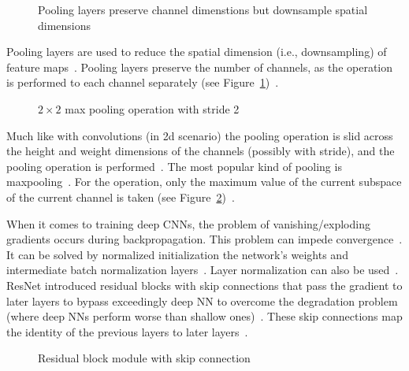 \begin{figure}[h]
    \centering
    \caption[Channel dimension preserving of pooling layers]{%
        Pooling layers preserve channel dimenstions but downsample spatial
        dimensions\label{fig:pool-layer}
    }
\end{figure}
Pooling layers are used to reduce the spatial dimension (i.e., downsampling) of feature
maps~\citep{ponti_everything_2017}.
Pooling layers preserve the number of channels, as the operation is performed to each channel
separately (see Figure~\ref{fig:pool-layer})~\citep{chauhan_review_2018}.
\begin{figure}[ht]
    \centering
    \caption[Visualization of a max pooling operation]{%
        $2\times 2$ max pooling operation with stride
        2~\citep{chauhan_review_2018}\label{fig:maxpool}
    }
\end{figure}
Much like with convolutions (in 2d scenario) the pooling operation is slid across the height and
weight dimensions of the channels (possibly with stride), and the pooling operation is
performed~\citep{ponti_everything_2017,chauhan_review_2018}.
The most popular kind of pooling is maxpooling~\citep{ponti_everything_2017}.
For the operation, only the maximum value of the current subspace of the current channel is
taken (see Figure~\ref{fig:maxpool})~\citep{chauhan_review_2018}.

When it comes to training deep \acp{CNN}, the problem of vanishing/exploding gradients occurs during
backpropagation.
This problem can impede convergence~\citep{he_deep_2015}.
It can be solved by normalized initialization the network's weights and intermediate
batch normalization layers~\citep{he_deep_2015,bjorck_understanding_2018}.
Layer normalization can also be used~\citep{liu_rethinking_2021,ba_layer_2016}.
ResNet introduced residual blocks with skip connections that pass the gradient to later layers
to bypass exceedingly deep \ac{NN} to overcome the degradation problem (where deep \acp{NN} perform
worse than shallow ones)~\citep{he_deep_2015}.
These skip connections map the identity of the previous layers to later
layers~\citep{he_deep_2015}.
\begin{figure}[ht]
    \centering
    \caption[Skip connection introduced by residual blocks]{%
        Residual block module with skip
        connection~\citep{he_deep_2015}\label{fig:skip-conn}
    }
\end{figure}

